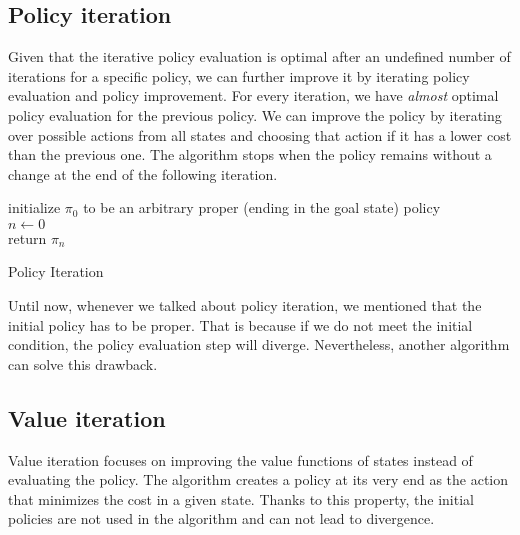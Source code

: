\subsection{Policy iteration}
Given that the iterative policy evaluation is optimal after an undefined number of iterations for a specific policy, we can further improve it by iterating policy evaluation and policy improvement.
For every iteration, we have \textit{almost} optimal policy evaluation for the previous policy. We can improve the policy by iterating over possible actions from all states and choosing that action if it has a lower cost than the previous one. The algorithm stops when the policy remains without a change at the end of the following iteration.

\LinesNumbered
\begin{algorithm}[H]
\SetAlgoLined
initialize $\pi_0$ to be an arbitrary proper (ending in the goal state) policy \\
$n \xleftarrow{} 0$ \\
return $\pi_n$
\caption{Policy Iteration}
\end{algorithm}

Until now, whenever we talked about policy iteration, we mentioned that the initial policy has to be proper.
That is because if we do not meet the initial condition, the policy evaluation step will diverge.
Nevertheless, another algorithm can solve this drawback.


\subsection{Value iteration}
Value iteration focuses on improving the value functions of states instead of evaluating the policy. The algorithm creates a policy at its very end as the action that minimizes the cost in a given state. Thanks to this property, the initial policies are not used in the algorithm and can not lead to divergence.

